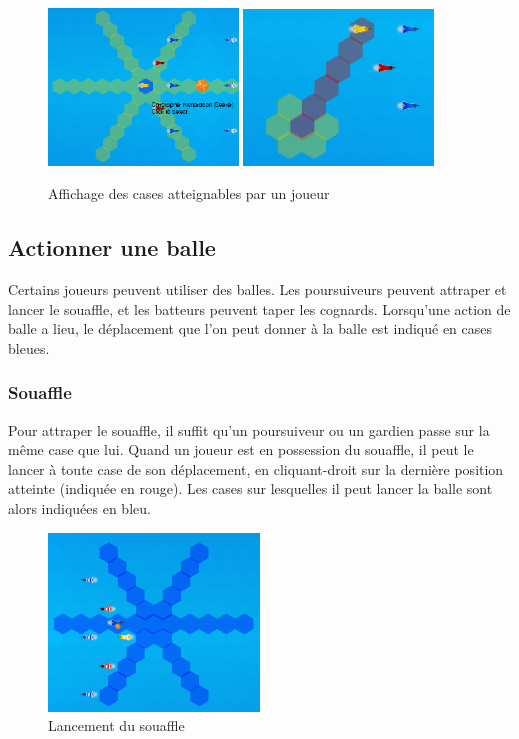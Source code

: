 \begin{figure}[h!]
    \centering
    \includegraphics[width=0.45\textwidth]{../screenshots/assign_move.png}
    \includegraphics[width=0.45\textwidth]{../screenshots/assign_move2.png}
    \caption{\label{manual:assign_move} Affichage des cases atteignables par un joueur}
\end{figure}

\subsection{Actionner une balle}
Certains joueurs peuvent utiliser des balles. Les poursuiveurs peuvent attraper et lancer le \gls{souaffle}, et les batteurs peuvent taper les 
\gls{cognard}s. Lorsqu'une action de balle a lieu, le déplacement que l'on peut donner à la balle est indiqué en cases bleues.

\subsubsection{Souaffle}
Pour attraper le souaffle, il suffit qu'un poursuiveur ou un gardien passe sur la même case que lui. Quand un joueur est en possession du souaffle, il peut le lancer à toute case de son déplacement, en cliquant-droit sur la dernière position atteinte (indiquée en rouge). Les cases sur lesquelles il peut lancer la balle sont alors indiquées en bleu.

\begin{figure}[h!]
    \centering
    \includegraphics[width=0.5\textwidth]{../screenshots/throw_quaffle.png}
    \caption{\label{manual:throw_quaffle} Lancement du souaffle}
\end{figure}


